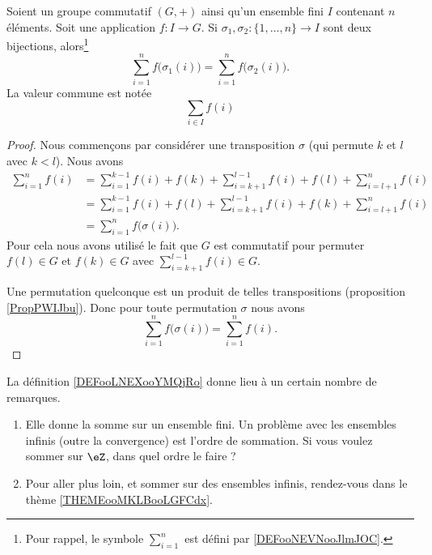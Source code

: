 \begin{lemmaDef}       \label{DEFooLNEXooYMQjRo}
	Soient un groupe commutatif \( (G,+)\) ainsi qu'un ensemble fini \( I\) contenant \( n\) éléments. Soit une application \( f\colon I\to G \). Si \( \sigma_1,\sigma_2\colon \{1,\ldots, n \}\to I\) sont deux bijections, alors\footnote{Pour rappel, le symbole \( \sum_{i=1}^n\) est défini par \ref{DEFooNEVNooJlmJOC}.}
	\begin{equation}
		\sum_{i=1}^nf\big( \sigma_1(i) \big)=\sum_{i=1}^nf\big( \sigma_2(i) \big).
	\end{equation}
	La valeur commune est notée
	\begin{equation}	\label{EQooWTTJooIJEbrV}
		\sum_{i\in I}f(i)
	\end{equation}
\end{lemmaDef}

\begin{proof}
	Nous commençons par considérer une transposition \( \sigma\) (qui permute \( k\) et \( l\) avec \( k<l\)). Nous avons
	\begin{subequations}
		\begin{align}
			\sum_{i=1}^nf(i) & =\sum_{i=1}^{k-1}f(i)+f(k)+\sum_{i=k+1}^{l-1}f(i)+f(l)+\sum_{i=l+1}^nf(i) \\
			                 & =\sum_{i=1}^{k-1}f(i)+f(l)+\sum_{i=k+1}^{l-1}f(i)+f(k)+\sum_{i=l+1}^nf(i) \\
			                 & =\sum_{i=1}^nf\big( \sigma(i) \big).
		\end{align}
	\end{subequations}
	Pour cela nous avons utilisé le fait que \( G\) est commutatif pour permuter \( f(l)\in G\) et \( f(k)\in G\) avec \( \sum_{i=k+1}^{l-1}f(i)\in G\).

	Une permutation quelconque est un produit de telles transpositions (proposition \ref{PropPWIJbu}). Donc pour toute permutation \( \sigma\) nous avons
	\begin{equation}
		\sum_{i=1}^nf\big( \sigma(i) \big)=\sum_{i=1}^nf(i).
	\end{equation}
\end{proof}

La définition \ref{DEFooLNEXooYMQjRo} donne lieu à un certain nombre de remarques.
\begin{enumerate}
	\item
	      Elle donne la somme sur un ensemble fini. Un problème avec les ensembles infinis (outre la convergence) est l'ordre de sommation. Si vous voulez sommer sur \( \eZ\), dans quel ordre le faire ?
	\item
	      Pour aller plus loin, et sommer sur des ensembles infinis, rendez-vous dans le thème \ref{THEMEooMKLBooLGFCdx}.
\end{enumerate}


